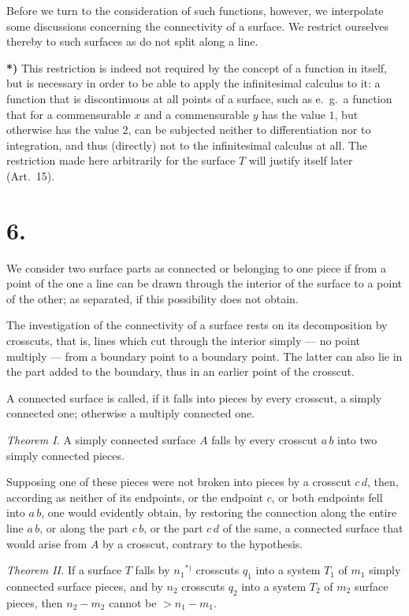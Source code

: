 \documentclass{article}
\begin{document}
Before we turn to the consideration of such functions, however, we interpolate some discussions concerning the connectivity of a surface. We restrict ourselves thereby to such surfaces as do not split along a line.

\textbf{*)} This restriction is indeed not required by the concept of a function in itself, but is necessary in order to be able to apply the infinitesimal calculus to it: a function that is discontinuous at all points of a surface, such as e.\ g.\ a function that for a commensurable $x$ and a commensurable $y$ has the value $1$, but otherwise has the value $2$, can be subjected neither to differentiation nor to integration, and thus (directly) not to the infinitesimal calculus at all. The restriction made here arbitrarily for the surface $T$ will justify itself later (Art.~15).

\section*{6.}

We consider two surface parts as connected or belonging to one piece if from a point of the one a line can be drawn through the interior of the surface to a point of the other; as separated, if this possibility does not obtain.

The investigation of the connectivity of a surface rests on its decomposition by crosscuts, that is, lines which cut through the interior simply --- no point multiply --- from a boundary point to a boundary point. The latter can also lie in the part added to the boundary, thus in an earlier point of the crosscut.

A connected surface is called, if it falls into pieces by every crosscut, a simply connected one; otherwise a multiply connected one.

\emph{Theorem I.} A simply connected surface $A$ falls by every crosscut $a\,b$ into two simply connected pieces.

Supposing one of these pieces were not broken into pieces by a crosscut $c\,d$, then, according as neither of its endpoints, or the endpoint $c$, or both endpoints fell into $a\,b$, one would evidently obtain, by restoring the connection along the entire line $a\,b$, or along the part $c\,b$, or the part $c\,d$ of the same, a connected surface that would arise from $A$ by a crosscut, contrary to the hypothesis.

\emph{Theorem II.} If a surface $T$ falls by $n_1{}^{*)}$ crosscuts $q_1$ into a system $T_1$ of $m_1$ simply connected surface pieces, and by $n_2$ crosscuts $q_2$ into a system $T_2$ of $m_2$ surface pieces, then $n_2 - m_2$ cannot be $> n_1 - m_1$.
\end{document}

